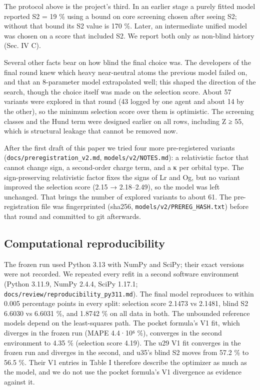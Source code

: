 \documentclass[aps,pra,preprint,superscriptaddress,amsmath,amssymb]{revtex4-2}
\begin{document}
The protocol above is the project's third. In an earlier stage a purely fitted model reported S2 = 19 \% using a bound on core screening chosen after seeing S2; without that bound its S2 value is 170 \%. Later, an intermediate unified model was chosen on a score that included S2. We report both only as non-blind history (Sec. IV C).


Several other facts bear on how blind the final choice was. The developers of the final round knew which heavy near-neutral atoms the previous model failed on, and that an 8-parameter model extrapolated well; this shaped the direction of the search, though the choice itself was made on the selection score. About 57 variants were explored in that round (43 logged by one agent and about 14 by the other), so the minimum selection score over them is optimistic. The screening classes and the Hund term were designed earlier on all rows, including Z ≥ 55, which is structural leakage that cannot be removed now.


After the first draft of this paper we tried four more pre-registered variants (\texttt{docs/preregistration\_v2.md}, \texttt{models/v2/NOTES.md}): a relativistic factor that cannot change sign, a second-order charge term, and a κ per orbital type. The sign-preserving relativistic factor fixes the signs of Lr and Og, but no variant improved the selection score (2.15 → 2.18–2.49), so the model was left unchanged. That brings the number of explored variants to about 61. The pre-registration file was fingerprinted (sha256, \texttt{models/v2/PREREG\_HASH.txt}) before that round and committed to git afterwards.


\subsection{Computational reproducibility}

The frozen run used Python 3.13 with NumPy and SciPy; their exact versions were not recorded. We repeated every refit in a second software environment (Python 3.11.9, NumPy 2.4.4, SciPy 1.17.1; \texttt{docs/review/reproducibility\_py311.md}). The final model reproduces to within 0.005 percentage points in every split: selection score 2.1473 vs 2.1481, blind S2 6.6030 vs 6.6031 \%, and 1.8742 \% on all data in both. The unbounded reference models depend on the least-squares path. The pocket formula's V1 fit, which diverges in the frozen run (MAPE 4.4·10⁶ \%), converges in the second environment to 4.35 \% (selection score 4.19). The u29 V1 fit converges in the frozen run and diverges in the second, and u35's blind S2 moves from 57.2 \% to 56.5 \%. Their V1 entries in Table I therefore describe the optimizer as much as the model, and we do not use the pocket formula's V1 divergence as evidence against it.
\end{document}
